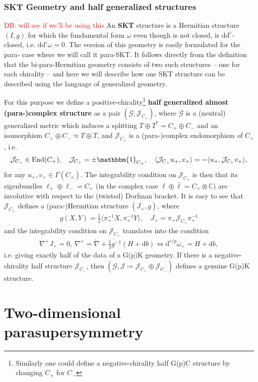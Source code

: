 \documentclass{article}
\newcommand{\TT}{{T\oplus T^*}}
\newcommand{\JJ}{\mathcal{J}}
\newcommand{\GG}{\mathcal{G}}
\newcommand{\id}{\mathbbm{1}}
\newcommand{\lc}{\mathring{\n}}
\newcommand{\n}{\nabla}
\newcommand{\rd}{\mathrm{d}}
\newcommand{\se}{\Gamma}
\newcommand{\la}{\langle}
\newcommand{\ra}{\rangle}
\theoremstyle{definition}
\theoremstyle{remark}
\DeclareMathOperator{\End}{End}
\def\david{\textcolor{red}{DB: }\textcolor{red}}
\begin{document}
\subsubsection{SKT Geometry and half generalized structures}
\david{will see if we'll be using this}
An {\bf SKT} structure is a Hermitian structure $(I,g)$ for which the fundamental form $\omega$ even though is not closed, is $\rd \rd^c$-closed, i.e. $\rd \rd^c \omega=0$. The version of this geometry is easily formulated for the para- case where we will call it para-SKT. It follows directly from the definition that the bi-para-Hermitian geometry consists of two such structures -- one for each chirality -- and here we will describe how one SKT structure can be described using the language of generalized geometry.

For this purpose we define a positive-chirality\footnote{Similarly one could define a negative-chirality half G(p)C structure by changing $C_+$ for $C_-$} {\bf half generalized almost (para-)complex structure} as a pair $(\GG,\JJ_{C_+})$, where $\GG$ is a (neutral) generalized metric which induces a splitting $\TT=C_+\oplus C_-$ and an isomorphism $C_+\oplus C_-\simeq T\oplus T$, and $\JJ_{C_+}$ is a (para-)complex endomorphism of $C_+$, i.e.
\begin{align*}
\JJ_{C_+}\in \End(C_+),\quad \JJ_{C_+}=\pm \id_{C_+},\quad \la \JJ_{C_+} u_+,v_+\ra=-\la u_+,\JJ_{C_+} v_+\ra,
\end{align*}
for any $u_+,v_+ \in \se(C_+)$. The integrability condition on $\JJ_{C_+}$ is then that its eigenbundles $\ell_+\oplus \ell_-=C_+$ (in the complex case $\ell\oplus \bar{\ell}=C_+\otimes \mathbb{C}$) are involutive with respect to the (twisted) Dorfman bracket. It is easy to see that $\JJ_{C_+}$ defines a (para-)Hermitian structure $(J_+,g)$, where
\begin{align*}
g(X,Y)=\frac{1}{2}\la \pi_+^{-1}X,\pi_+^{-1}Y\ra,\quad J_+=\pi_+\JJ_{C_+}\pi^{-1}_+
\end{align*}
and the integrability condition on $\JJ_{C_+}$ translates into the condition
\begin{align*}
\n^+J_+=0,\ \n^+=\lc+\frac{1}{2}g^{-1}(H+\rd b) \Longleftrightarrow \rd^{c/p}\omega_+=H+\rd b,
\end{align*}
i.e. giving exactly half of the data of a G(p)K geometry. If there is a negative-chirality half structure $\JJ_{C_-}$, then $(\GG,\JJ\coloneqq \JJ_{C_+}\oplus \JJ_{C_-})$ defines a genuine G(p)K structure.


\section{Two-dimensional parasupersymmetry}  \label{sec: parasusy}
\end{document}
